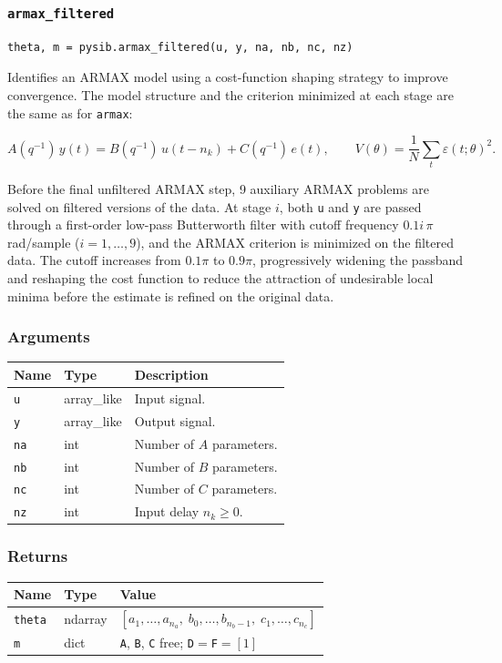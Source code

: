\documentclass[../main]{subfiles}
\begin{document}
\newpage

\subsubsection{\texttt{armax\_filtered}}

\begin{lstlisting}
theta, m = pysib.armax_filtered(u, y, na, nb, nc, nz)
\end{lstlisting}

Identifies an ARMAX model using a cost-function shaping strategy to
improve convergence.  The model structure and the criterion minimized
at each stage are the same as for \texttt{armax}:

\[
  A(q^{-1})\,y(t) = B(q^{-1})\,u(t-n_k) + C(q^{-1})\,e(t), \qquad
  V(\theta) = \frac{1}{N}\sum_t \varepsilon(t;\theta)^2.
\]

Before the final unfiltered ARMAX step, 9 auxiliary ARMAX problems
are solved on filtered versions of the data.  At stage $i$, both
\texttt{u} and \texttt{y} are passed through a first-order low-pass
Butterworth filter with cutoff frequency $0.1 i\,\pi$\,rad/sample
($i = 1,\ldots,9$), and the ARMAX criterion is minimized on the
filtered data.  The cutoff increases from $0.1\pi$ to $0.9\pi$,
progressively widening the passband and reshaping the cost function
to reduce the attraction of undesirable local minima before the
estimate is refined on the original data.

\subsubsection*{Arguments}
\begin{center}
\begin{tabular}{lll}
  \toprule
  Name & Type & Description \\
  \midrule
  \texttt{u}  & array\_like & Input signal. \\
  \texttt{y}  & array\_like & Output signal. \\
  \texttt{na} & int & Number of $A$ parameters. \\
  \texttt{nb} & int & Number of $B$ parameters. \\
  \texttt{nc} & int & Number of $C$ parameters. \\
  \texttt{nz} & int & Input delay $n_k \geq 0$. \\
  \bottomrule
\end{tabular}
\end{center}

\subsubsection*{Returns}
\begin{center}
\begin{tabular}{lll}
  \toprule
  Name & Type & Value \\
  \midrule
  \texttt{theta} & ndarray & $[a_1,\ldots,a_{n_a},\; b_0,\ldots,b_{n_b-1},\; c_1,\ldots,c_{n_c}]$ \\
  \texttt{m}     & dict    & \texttt{A}, \texttt{B}, \texttt{C} free; \texttt{D}$=$\texttt{F}$=[1]$ \\
  \bottomrule
\end{tabular}
\end{center}
\end{document}
